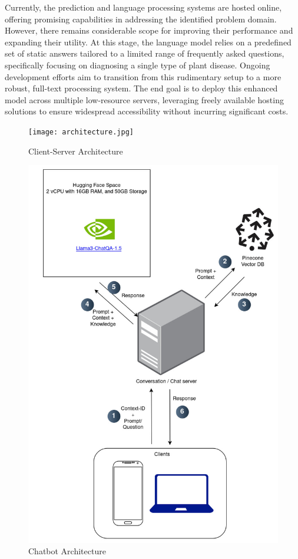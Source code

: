 Currently, the prediction and language processing systems are hosted online, offering promising capabilities in addressing the identified problem domain. However, there remains considerable scope for improving their performance and expanding their utility. At this stage, the language model relies on a predefined set of static answers tailored to a limited range of frequently asked questions, specifically focusing on diagnosing a single type of plant disease. Ongoing development efforts aim to transition from this rudimentary setup to a more robust, full-text processing system. The end goal is to deploy this enhanced model across multiple low-resource servers, leveraging freely available hosting solutions to ensure widespread accessibility without incurring significant costs.


\begin{figure}[h!]
    \centering
    \texttt{[image: architecture.jpg]}
    \caption{Client-Server Architecture}
    \label{fig:client_server_arch}
\end{figure}


\begin{figure}[h!]
    \centering
    \includegraphics[scale=0.5]{images/chatbot_arch.jpg}
    \caption{Chatbot Architecture}
    \label{fig:chatbot_arch}
\end{figure}


